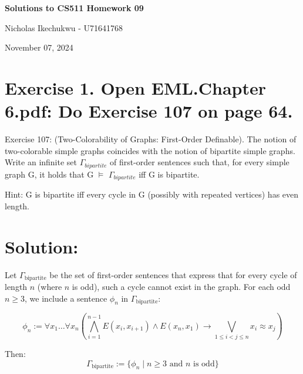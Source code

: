 \documentclass{article}
\begin{document}
\begin{center}
    \Large\textbf{Solutions to CS511 Homework 09}
    
    \vspace{0.5cm}
    
    \large Nicholas Ikechukwu - U71641768
    
    \vspace{0.3cm}
    
    \large November 07, 2024
\end{center}



\section*{Exercise 1. Open EML.Chapter 6.pdf: Do Exercise 107 on page 64. }


\begin{mdframed}
    Exercise 107: (Two-Colorability of Graphs: First-Order Deﬁnable). The notion of two-colorable
    simple graphs coincides with the notion of bipartite simple graphs. Write an inﬁnite set $\Gamma_{bipartite}$
    of ﬁrst-order sentences such that, for every simple graph G, it holds that G $\models$ $\Gamma_{bipartite}$ iﬀ G is
    bipartite.

    \vspace{1em} 
    Hint: G is bipartite iﬀ every cycle in G (possibly with repeated vertices) has even length. 
\end{mdframed}
\section*{Solution:}
Let $\Gamma_{\text{bipartite}}$ be the set of first-order sentences that express that for every cycle of length $n$ (where $n$ is odd), such a cycle cannot exist in the graph. For each odd $n \geq 3$, we include a sentence $\phi_n$ in $\Gamma_{\text{bipartite}}$:
    
    \[
    \phi_n := \forall x_1 \ldots \forall x_n \left(\bigwedge_{i=1}^{n-1} E(x_i,x_{i+1}) \land E(x_n,x_1) \rightarrow \bigvee_{1 \leq i < j \leq n} x_i \approx x_j\right)
    \]
    
    Then:
    \[
    \Gamma_{\text{bipartite}} := \{\phi_n \mid n \geq 3 \text{ and } n \text{ is odd}\}
    \]
    
\end{document}
